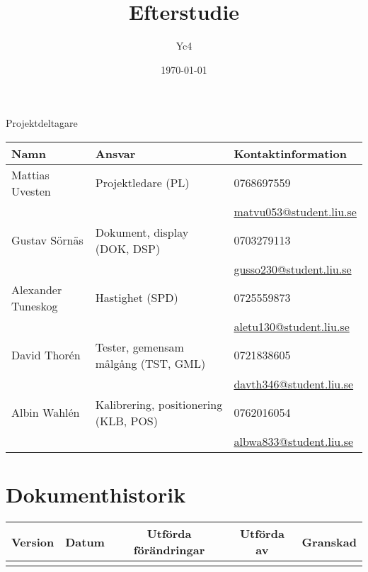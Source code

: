 \documentclass[10pt,oneside,swedish]{lips}
\title{Efterstudie}
\author{Yc4}
\date{\today}
\begin{document}
\maketitle

\cleardoublepage
\makeprojectid

\begin{center}
  \Large Projektdeltagare
\end{center}
\begin{center}
  \begin{tabular}{|l|l|l|} \hline
    \textbf{Namn} & \textbf{Ansvar} & \textbf{Kontaktinformation }\\\hline

    Mattias Uvesten & Projektledare (PL) & 0768697559\\
    && \url{matvu053@student.liu.se} \\\hline

    Gustav Sörnäs & Dokument, display (DOK, DSP) & 0703279113\\
    && \url{gusso230@student.liu.se} \\\hline

    Alexander Tuneskog & Hastighet (SPD) & 0725559873 \\
    && \url{aletu130@student.liu.se} \\\hline

    David Thorén & Tester, gemensam målgång (TST, GML) & 0721838605 \\
    && \url{davth346@student.liu.se} \\\hline

    Albin Wahlén & Kalibrering, positionering (KLB, POS) & 0762016054 \\
    && \url{albwa833@student.liu.se} \\\hline
  \end{tabular}
\end{center}

\cleardoublepage
\tableofcontents

\cleardoublepage
\section*{Dokumenthistorik}
\begin{tabular}{|p{}|p{}|p{}|p{}|p{}|} 
  \hline
  \multicolumn{1}{|c}{\bfseries Version} &
  \multicolumn{1}{|c}{\bfseries Datum} &
  \multicolumn{1}{|c}{\bfseries Utförda förändringar} &
  \multicolumn{1}{|c}{\bfseries Utförda av} &
  \multicolumn{1}{|c|}{\bfseries Granskad}\\
  \hline \hline
  &&&& \\
  \hline
\end{tabular}
\end{document}
